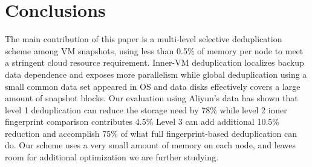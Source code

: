 \section{Conclusions}
\label{sect:final}
The main contribution of this paper is a multi-level selective deduplication scheme among VM 
snapshots, using less than 0.5\% of memory per node to meet a stringent cloud resource requirement. 
Inner-VM deduplication localizes backup data dependence and exposes more parallelism  
while global deduplication using a small common data set appeared in OS and data disks
effectively  covers a large amount of snapshot blocks.
Our evaluation using Aliyun's data has shown that 
level 1 deduplication can reduce the storage need by 78\% while level 2 inner 
fingerprint comparison contributes 4.5\%%
Level 3 can add additional 10.5\% reduction and accomplish 75\% of what full fingerprint-based
deduplication can do. Our scheme uses a very small amount of memory on each node, and leaves
room for additional optimization we are further studying.
 
%
%

